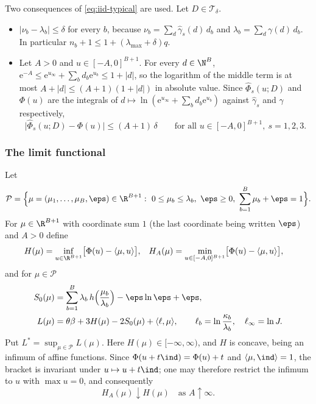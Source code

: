 Two consequences of \eqref{eq:iid-typical} are used. Let $D\in\mathcal{T}_\delta$.
\begin{itemize}
\item[(T1)] $|\nu_b-\lambda_b|\le\delta$ for every $b$, because
$\nu_b=\sum_d\widehat\gamma_s(d)\,d_b$ and $\lambda_b=\sum_d\gamma(d)\,d_b$. In particular
$n_b+1\le1+(\lambda_{\max}+\delta)q$.
\item[(T2)] Let $A>0$ and $u\in[-A,0]^{B+1}$. For every $d\in\N^B$,
$\mathrm{e}^{-A}\le\mathrm{e}^{u_\infty}+\sum_bd_b\mathrm{e}^{u_b}\le1+|d|$, so the
logarithm of the middle term is at most $A+|d|\le(A+1)(1+|d|)$ in absolute value. Since $\widehat\Phi_s(u;D)$ and $\Phi(u)$ are the integrals of
$d\mapsto\ln(\mathrm{e}^{u_\infty}+\sum_bd_b\mathrm{e}^{u_b})$ against $\widehat\gamma_s$
and $\gamma$ respectively,
\begin{equation}\label{eq:iid-phihat}
\bigl|\widehat\Phi_s(u;D)-\Phi(u)\bigr|\le(A+1)\,\delta\qquad
\text{for all }u\in[-A,0]^{B+1},\ s=1,2,3 .
\end{equation}
\end{itemize}

\subsubsection*{The limit functional}
Let
\[
\mathcal{P}=\Bigl\{\mu=(\mu_1,\dots,\mu_B,\eps)\in\R^{B+1}:\ 0\le\mu_b\le\lambda_b,\
\eps\ge0,\ \sum_{b=1}^B\mu_b+\eps=1\Bigr\}.
\]
For $\mu\in\R^{B+1}$ with coordinate sum $1$ (the last coordinate being written $\eps$)
and $A>0$ define
\begin{align*}
H(\mu)&=\inf_{u\in\R^{B+1}}\bigl[\Phi(u)-\langle\mu,u\rangle\bigr],&
H_A(\mu)&=\min_{u\in[-A,0]^{B+1}}\bigl[\Phi(u)-\langle\mu,u\rangle\bigr],
\end{align*}
and for $\mu\in\mathcal{P}$
\begin{align*}
S_0(\mu)&=\sum_{b=1}^B\lambda_b\,h\Bigl(\frac{\mu_b}{\lambda_b}\Bigr)-\eps\ln\eps+\eps,\\
L(\mu)&=\theta\beta+3H(\mu)-2S_0(\mu)+\langle\ell,\mu\rangle,\qquad
\ell_b=\ln\frac{\kappa_b}{\lambda_b},\quad\ell_\infty=\ln J .
\end{align*}
Put $L^\ast=\sup_{\mu\in\mathcal{P}}L(\mu)$. Here $H(\mu)\in[-\infty,\infty)$, and $H$ is
concave, being an infimum of affine functions. Since
$\Phi(u+t\ind)=\Phi(u)+t$ and $\langle\mu,\ind\rangle=1$, the bracket is invariant under
$u\mapsto u+t\ind$; one may therefore restrict the infimum to $u$ with $\max u=0$, and
consequently
\begin{equation}\label{eq:iid-HA}
H_A(\mu)\downarrow H(\mu)\quad\text{as }A\uparrow\infty .
\end{equation}

